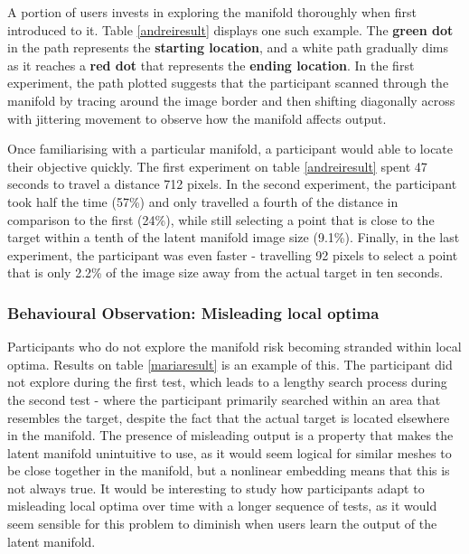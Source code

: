 \documentclass[ %
author={Dillon Keith Diep},
supervisor={Dr. Carl Henrik Ek},
degree={MEng},
title={ART-CG Hair:},
subtitle={Assisted Real-time Content Generation of Stylised Virtual Hair},
type={Research},
year={2017} ]{dissertation}
\begin{document}
	A portion of users invests in exploring the manifold thoroughly when first introduced to it. Table \ref{andreiresult} displays one such example. The \textbf{green dot} in the path represents the \textbf{starting location}, and a white path gradually dims as it reaches a \textbf{red dot} that represents the \textbf{ending location}. In the first experiment, the path plotted suggests that the participant scanned through the manifold by tracing around the image border and then shifting diagonally across with jittering movement to observe how the manifold affects output.
	
	Once familiarising with a particular manifold, a participant would able to locate their objective quickly. The first experiment on table \ref{andreiresult} spent 47 seconds to travel a distance 712 pixels. In the second experiment, the participant took half the time (57\%) and only travelled a fourth of the distance in comparison to the first (24\%), while still selecting a point that is close to the target within a tenth of the latent manifold image size (9.1\%). Finally, in the last experiment, the participant was even faster - travelling 92 pixels to select a point that is only 2.2\% of the image size away from the actual target in ten seconds.
	
	\subsubsection{Behavioural Observation: Misleading local optima}
	
	Participants who do not explore the manifold risk becoming stranded within local optima. Results on table \ref{mariaresult} is an example of this. The participant did not explore during the first test, which leads to a lengthy search process during the second test - where the participant primarily searched within an area that resembles the target, despite the fact that the actual target is located elsewhere in the manifold. The presence of misleading output is a property that makes the latent manifold unintuitive to use, as it would seem logical for similar meshes to be close together in the manifold, but a nonlinear embedding means that this is not always true. It would be interesting to study how participants adapt to misleading local optima over time with a longer sequence of tests, as it would seem sensible for this problem to diminish when users learn the output of the latent manifold.
	
\end{document}
